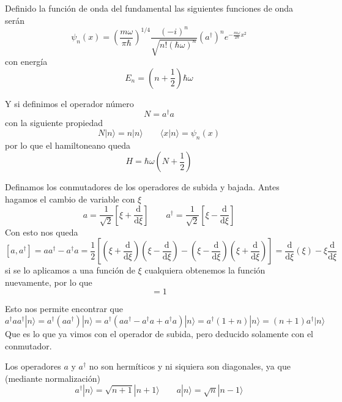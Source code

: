\documentclass{book}
\numberwithin{equation}{section} %
\begin{document}
Definido la función de onda del fundamental las siguientes funciones de onda serán
\begin{equation}
    \psi_n(x) = \left(\frac{m \omega}{\pi \hbar}\right)^{1/4} \frac{(-i)^n}{\sqrt{n!(\hbar \omega)^n}} (a^\dagger)^n e^{-\frac{m \omega}{2\hbar} x^2}
\end{equation}
con energía
\begin{equation}
    E_n = \left(n + \frac{1}{2}\right) \hbar \omega
\end{equation}

Y si definimos el operador número
\begin{equation}
    N = a^\dagger a
\end{equation}
con la siguiente propiedad
\begin{equation}
    N |n\rangle = n |n\rangle \qquad \langle x | n \rangle = \psi_n(x)
\end{equation}
por lo que el hamiltoneano queda
\begin{equation}
    H = \hbar \omega \left(N + \frac{1}{2}\right)
\end{equation}

Definamos los conmutadores de los operadores de subida y bajada.
Antes hagamos el cambio de variable con $\xi$
\begin{equation}
    a = \frac{1}{\sqrt{2}} \left[ \xi + \frac{\mathrm{d}}{\mathrm{d}\xi} \right] \qquad a^{\dagger} = \frac{1}{\sqrt{2}} \left[ \xi - \frac{\mathrm{d}}{\mathrm{d}\xi}\right]
\end{equation}
Con esto nos queda
\[ [a,a^\dagger] = a a^\dagger - a^\dagger a = \frac{1}{2} \left[ \left(\xi + \frac{\mathrm{d}}{\mathrm{d}\xi} \right) \left(\xi - \frac{\mathrm{d}}{\mathrm{d}\xi} \right) - \left(\xi - \frac{\mathrm{d}}{\mathrm{d}\xi}\right) \left( \xi + \frac{\mathrm{d}}{\mathrm{d}\xi} \right)\right] = \frac{\mathrm{d}}{\mathrm{d}\xi} (\xi) - \xi \frac{\mathrm{d}}{\mathrm{d}\xi}\]
si se lo aplicamos a una función de $\xi$ cualquiera obtenemos la función nuevamente, por lo que
\begin{equation}
    [a, a^{\dagger}] = 1
\end{equation}

Esto nos permite encontrar que
\[ a^\dagger a a^\dagger |n\rangle =  a^\dagger (a a^\dagger) |n \rangle = a^\dagger (a a^\dagger - a^\dagger a + a^\dagger a) |n \rangle = a^\dagger (1 + n) |n\rangle = (n + 1) a^\dagger |n\rangle\]
Que es lo que ya vimos con el operador de subida, pero deducido solamente con el conmutador.

Los operadores $a$ y $a^\dagger$ no son hermíticos y ni siquiera son diagonales, ya que (mediante normalización)
\begin{equation}
    a^\dagger |n \rangle = \sqrt{n + 1} |n + 1\rangle \qquad a|n\rangle = \sqrt{n} |n - 1\rangle
\end{equation}
\end{document}
